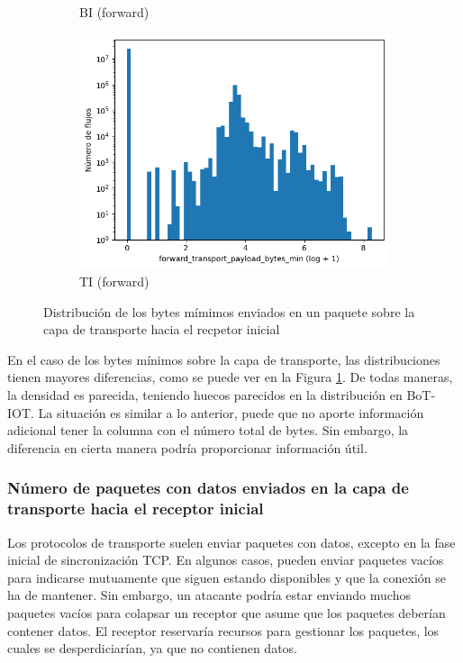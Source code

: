 \begin{figure}[H]
\begin{subfigure}[b]{0.32\textwidth}
        \caption{BI (forward)}
    \end{subfigure}
    \hfill
    \begin{subfigure}[b]{0.32\textwidth}
        \centering
        \includegraphics[width=\linewidth]{media/packet_pincer_toniot/forward_transport_payload_bytes_min_log_x_log_y.png}
        \caption{TI (forward)}
    \end{subfigure}
       \caption{Distribución de los bytes mímimos enviados en un paquete sobre la capa de transporte hacia el recpetor inicial}
       \label{fig:packet_pincer_forward_transport_payload_bytes_min}
\end{figure}

En el caso de los bytes mínimos sobre la capa de transporte, las distribuciones tienen mayores diferencias, como se puede ver en la Figura \ref{fig:packet_pincer_forward_transport_payload_bytes_min}. De todas maneras, la densidad es parecida, teniendo huecos parecidos en la distribución en BoT-IOT. La situación es similar a lo anterior, puede que no aporte información adicional tener la columna con el número total de bytes. Sin embargo, la diferencia en cierta manera podría proporcionar información útil.

\subsubsection{Número de paquetes con datos enviados en la capa de transporte hacia el receptor inicial}

Los protocolos de transporte suelen enviar paquetes con datos, excepto en la fase inicial de sincronización TCP. En algunos casos, pueden enviar paquetes vacíos para indicarse mutuamente que siguen estando disponibles y que la conexión se ha de mantener. Sin embargo, un atacante podría estar enviando muchos paquetes vacíos para colapsar un receptor que asume que los paquetes deberían contener datos. El receptor reservaría recursos para gestionar los paquetes, los cuales se desperdiciarían, ya que no contienen datos.

